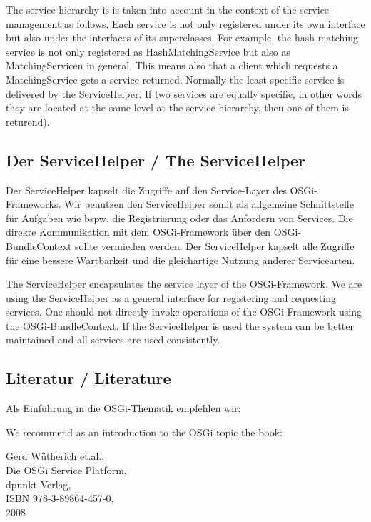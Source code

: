 \documentclass[10pt,a4paper]{scrartcl}
\providecommand{\deng}[2]{#1 / {\sffamily #2}}
\providecommand{\deutsch}[1]{#1}
\providecommand{\englisch}[1]{{\sffamily #1}}
\begin{document}
\englisch{The service hierarchy is is taken into account in the context of the
service-management as follows. Each service is not only registered under its own
interface but also under the interfaces of its superclasses. For example, the
hash matching service is not only registered as HashMatchingService but also as
MatchingServicen in general. This means also that a client which requests a
MatchingService gets a service returned. Normally the least specific service is
delivered by the ServiceHelper. If two services are equally specific, in other
words they are located at the same level at the service hierarchy, then one of
them is returend).}

\subsection{\deng{Der ServiceHelper}{The ServiceHelper}}
\label{service-helper}
\deutsch{Der ServiceHelper kapselt die Zugriffe auf den Service-Layer des
OSGi-Frameworks. Wir benutzen den ServiceHelper somit als allgemeine
Schnittstelle für Aufgaben wie bspw. die Registrierung oder das Anfordern von
Services. Die direkte Kommunikation mit dem OSGi-Framework über den
OSGi-BundleContext sollte vermieden werden. Der ServiceHelper kapselt alle
Zugriffe für eine bessere Wartbarkeit und die gleichartige Nutzung anderer
Servicearten.}

\englisch{The ServiceHelper encapsulates the service layer of the OSGi-Framework.
We are using the ServiceHelper as a general interface for registering and
requesting services. One should not directly invoke operations of the
OSGi-Framework using the OSGi-BundleContext. If the ServiceHelper is used the
system can be better maintained and all services are used consistently.}

\subsection{\deng{Literatur}{Literature}}
\deutsch{Als Einführung in die OSGi-Thematik empfehlen wir:}

\englisch{We recommend as an introduction to the OSGi topic the book:}

\noindent Gerd Wütherich et.al.,\\
Die OSGi Service Platform,\\
dpunkt Verlag,\\
ISBN 978-3-89864-457-0,\\
2008
\end{document}
